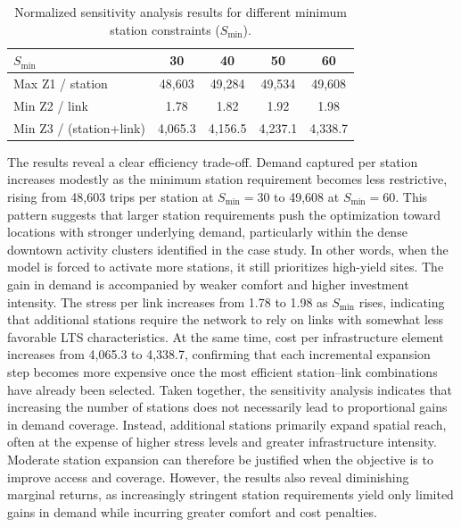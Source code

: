 \documentclass[preprint,authoryear,10pt]{elsarticle}
\begin{document}
\begin{table}[!ht]
  \caption{Normalized sensitivity analysis results for different minimum station constraints ($S_{\min}$).}
  \label{tab:sensitivity_smin_normalized}
  \centering
  \small
  \begin{tabular}{@{}lcccc@{}}
    \hline
    \textbf{$S_{\min}$} & \textbf{30} & \textbf{40} & \textbf{50} & \textbf{60} \\
    \hline
    Max Z1 / station & 48,603 & 49,284 & 49,534 & 49,608 \\
    Min Z2 / link    & 1.78   & 1.82   & 1.92   & 1.98   \\
    Min Z3 / (station+link) & 4,065.3 & 4,156.5 & 4,237.1 & 4,338.7 \\
    \hline
  \end{tabular}
\end{table}

The results reveal a clear efficiency trade-off. Demand captured per station increases modestly as the minimum station requirement becomes less restrictive, rising from 48,603 trips per station at $S_{\min}=30$ to 49,608 at $S_{\min}=60$. This pattern suggests that larger station requirements push the optimization toward locations with stronger underlying demand, particularly within the dense downtown activity clusters identified in the case study. In other words, when the model is forced to activate more stations, it still prioritizes high-yield sites. The gain in demand is accompanied by weaker comfort and higher investment intensity. The stress per link increases from 1.78 to 1.98 as $S_{\min}$ rises, indicating that additional stations require the network to rely on links with somewhat less favorable LTS characteristics. At the same time, cost per infrastructure element increases from 4,065.3 to 4,338.7, confirming that each incremental expansion step becomes more expensive once the most efficient station--link combinations have already been selected. Taken together, the sensitivity analysis indicates that increasing the number of stations does not necessarily lead to proportional gains in demand coverage. Instead, additional stations primarily expand spatial reach, often at the expense of higher stress levels and greater infrastructure intensity. Moderate station expansion can therefore be justified when the objective is to improve access and coverage. However, the results also reveal diminishing marginal returns, as increasingly stringent station requirements yield only limited gains in demand while incurring greater comfort and cost penalties.
\end{document}
